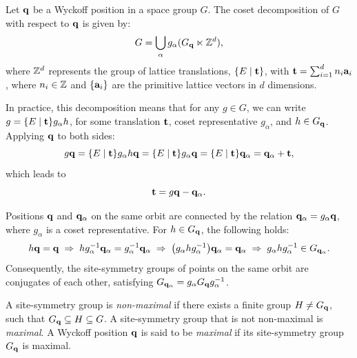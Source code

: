 \begin{lemma} \label{lemma:cosetdecomp_wyckoff}
Let \( {\vb{q}} \) be a Wyckoff position in a space group \( G \). The coset decomposition of \( G \) with respect to \( {\vb{q}} \) is given by:
\begin{equation} \label{eq:coset_decomp_wyckoff}
G = \bigcup_\alpha g_\alpha (G_{{\vb{q}}} \ltimes {\mathbb{Z}}^d),
\end{equation}
where \( {\mathbb{Z}}^d \) represents the group of lattice translations, \(\{E\mid {\vb{t}}\}\), with \({\vb{t}} = \sum_{i=1}^d n_i {\vb{a}}_i\), where \( n_i \in {\mathbb{Z}} \) and \(\{{\vb{a}}_i\}\) are the primitive lattice vectors in \( d \) dimensions.

In practice, this decomposition means that for any \( g \in G \), we can write \( g = \{E \mid {\vb{t}}\} g_\alpha h \), for some translation \({\vb{t}}\), coset representative \( g_\alpha \), and \( h \in G_{\vb{q}} \). Applying \( {\vb{q}} \) to both sides:
\begin{equation} \label{eq:coset_decomp_translation_t_step1}
g {\vb{q}} = \{E \mid {\vb{t}}\} g_\alpha h {\vb{q}} = \{E \mid {\vb{t}}\} g_\alpha {\vb{q}} = \{E \mid {\vb{t}}\} {\vb{q}}_\alpha = {\vb{q}}_\alpha + {\vb{t}},
\end{equation}
which leads to
\begin{equation} \label{eq:coset_decomp_translation_t}
{\vb{t}} = g {\vb{q}} - {\vb{q}}_\alpha.
\end{equation}
\end{lemma}

\begin{lemma} \label{lemma:conjugate_group_G_qalpha}
Positions \({\vb{q}}\) and \({\vb{q}}_\alpha\) on the same orbit are connected by the relation \({\vb{q}}_\alpha = g_\alpha {\vb{q}}\), where \(g_\alpha\) is a coset representative. For \(h \in G_{\vb{q}}\), the following holds:
\begin{equation} \label{eq:conjugate_group_qalpha}
h {\vb{q}} = {\vb{q}} \; \Rightarrow \; h g_\alpha^{-1} {\vb{q}}_\alpha = g_\alpha^{-1} {\vb{q}}_\alpha \; \Rightarrow \;
\qty(g_\alpha h g_\alpha^{-1}) {\vb{q}}_\alpha = {\vb{q}}_\alpha \; \Rightarrow \;
g_\alpha h g_\alpha^{-1} \in G_{{\vb{q}}_\alpha}.
\end{equation}
Consequently, the site-symmetry groups of points on the same orbit are conjugates of each other, satisfying \(G_{{\vb{q}}_\alpha} = g_\alpha G_{\vb{q}} g_\alpha^{-1}\).
\end{lemma}


\begin{definition} \label{def:maximal_wyckpos}
A site-symmetry group is \textit{non-maximal} if there exists a finite group $H \neq G_{\vb{q}}$, such that $G_{\vb{q}} \subseteq H \subseteq G$. A site-symmetry group that is not non-maximal is \textit{maximal}. A Wyckoff position ${\vb{q}}$ is said to be \textit{maximal} if its site-symmetry group $G_{\vb{q}}$ is maximal.
\end{definition}

